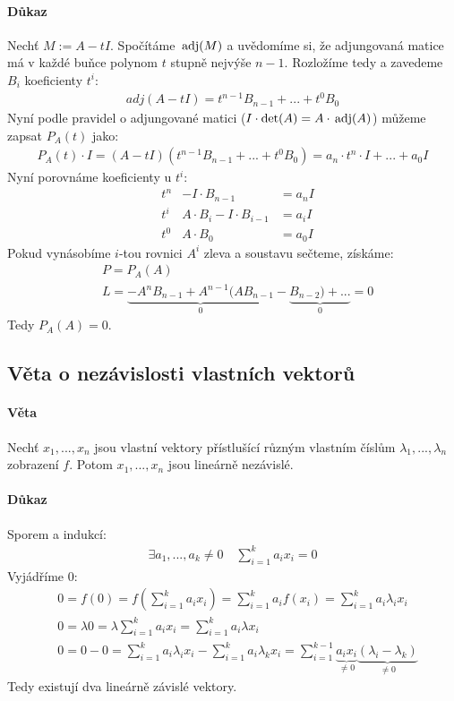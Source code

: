 \documentclass[a4paper,10pt]{article}
\begin{document}
\paragraph{Důkaz}
Nechť $M :=  A - tI$. Spočítáme $\operatorname*{\,adj}(M)$ a uvědomíme si, že adjungovaná matice
má v každé buňce polynom $t$ stupně nejvýše $n-1$. Rozložíme tedy a zavedeme
$B_i$ koeficienty $t^i$:
\begin{align}
	adj(A - tI) = t^{n-1} B_{n-1} + ... + t^0 B_0
\end{align}
Nyní podle pravidel o adjungované matici ($I \cdot \det(A) = A \cdot \operatorname*{\,adj}(A)$) můžeme zapsat $P_A(t)$ jako:
\begin{align}
	P_A(t) \cdot I = (A - tI)(t^{n-1} B_{n-1} + ... + t^0 B_0) = a_n \cdot t^n
	\cdot I + ... + a_0 I
\end{align}
Nyní porovnáme koeficienty u $t^i$:
\begin{align}
	&t^n &-I \cdot B_{n-1} &= a_n I \\
	&t^i &A \cdot B_i - I \cdot B_{i-1} &= a_i I \\
	&t^0 &A \cdot B_0 &= a_0 I
\end{align}
Pokud vynásobíme $i$-tou rovnici $A^i$ zleva a soustavu sečteme, získáme:
\begin{align}
	&P = P_A(A) \\
	&L = \underbrace{-A^n B_{n-1} + A^{n-1}(AB_{n-1}}_0 - \underbrace{B_{n-2}) +
	... }_0 = 0
\end{align}
Tedy $P_A(A) = 0$.

\subsection{Věta o nezávislosti vlastních vektorů}
\setcounter{equation}{0}
\paragraph{Věta}
Nechť $x_1, ..., x_n$ jsou vlastní vektory přístlušící různým vlastním číslům
$\lambda_1, ..., \lambda_n$ zobrazení $f$. Potom $x_1, ..., x_n$ jsou lineárně
nezávislé.
\paragraph{Důkaz}
Sporem a indukcí: 
\begin{align}
	\exists a_1, ..., a_k \neq 0  \quad \sum_{i=1}^k a_i x_i = 0
\end{align}
Vyjádříme 0:
\begin{align}
	&0 = f(0) = f\left(\sum_{i=1}^k a_i x_i\right) = \sum_{i=1}^k a_i f(x_i) =
	\sum_{i=1}^k a_i \lambda_i x_i \\
	&0 = \lambda 0 = \lambda \sum_{i=1}^k a_i x_i = \sum_{i=1}^k a_i \lambda
	x_i\\
	&0 = 0 - 0 = \sum_{i=1}^k a_i \lambda_i x_i - \sum_{i=1}^k a_i \lambda_k x_i 
	= \sum_{i=1}^{k-1} \underbrace{a_i x_i}_{\neq 0} \underbrace{( \lambda_i -
	\lambda_k)}_{\neq 0}
\end{align}
Tedy existují dva lineárně závislé vektory.
\end{document}
